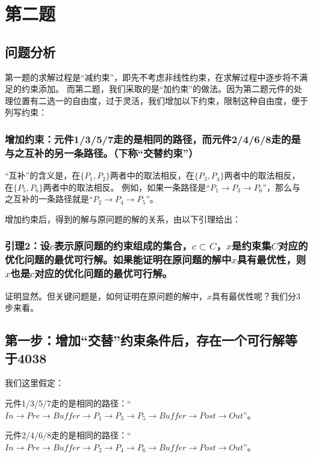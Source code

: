 \documentclass{ctexart}
\begin{document}
\section{第二题}
{
    \subsection{问题分析}
    {
        第一题的求解过程是“减约束”，即先不考虑非线性约束，在求解过程中逐步将不满足的约束添加。
        而第二题，我们采取的是“加约束”的做法。因为第二题元件的处理位置有二选一的自由度，过于灵活，我们增加以下约束，限制这种自由度，便于列写约束：

        \subsubsection*{增加约束：元件1/3/5/7走的是相同的路径，而元件2/4/6/8走的是与之互补的另一条路径。（下称“交替约束”）}

        “互补”的含义是，在$\{P_1, P_2\} $两者中的取法相反，在$\{P_3, P_4\} $两者中的取法相反，在$\{P_5, P_6\} $两者中的取法相反。
        例如，如果一条路径是“$P_1\rightarrow P_3\rightarrow P_6$”，那么与之互补的一条路径就是“$P_2\rightarrow P_4\rightarrow P_5$”。

        增加约束后，得到的解与原问题的解的关系，由以下引理给出：

        \subsubsection*{引理2：设$c$表示原问题的约束组成的集合，$c \subset C$，$x$是约束集$C$对应的优化问题的最优可行解。如果能证明在原问题的解中$x$具有最优性，则$x$也是$c$对应的优化问题的最优可行解。}

        证明显然。但关键问题是，如何证明在原问题的解中，$x$具有最优性呢？我们分3步来看。

    }

	
	

    \subsection{第一步：增加“交替”约束条件后，存在一个可行解等于4038}
    {

        我们这里假定：
        
        元件1/3/5/7走的是相同的路径：“$In\rightarrow Pre\rightarrow Buffer\rightarrow P_1\rightarrow P_3\rightarrow P_5\rightarrow Buffer \rightarrow Post \rightarrow Out$”。
        
        元件2/4/6/8走的是相同的路径：“$In\rightarrow Pre\rightarrow Buffer\rightarrow P_2\rightarrow P_4\rightarrow P_6\rightarrow Buffer \rightarrow Post \rightarrow Out$”。
        
}}
\end{document}
